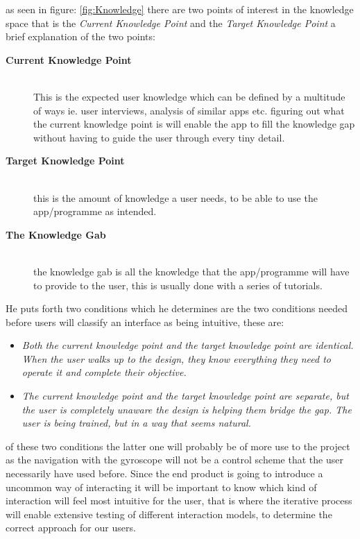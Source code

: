 as seen in figure: \ref{fig:Knowledge} there are two points of interest in the knowledge space that is the \textit{Current Knowledge Point} and the \textit{Target Knowledge Point} a brief explanation of the two points:
\begin{description}
 \item[\textbf{Current Knowledge Point}] \hfill\\
 This is the expected user knowledge which can be defined by a multitude of ways ie. user interviews, analysis of similar apps etc. figuring out what the current knowledge point is will enable the app to fill the knowledge gap without having to guide the user through every tiny detail. 
\item[\textbf{Target Knowledge Point}]\hfill\\
this is the amount of knowledge a user needs, to be able to use the app/programme as intended.
\item[\textbf{The Knowledge Gab}]\hfill\\
the knowledge gab is all the knowledge that the app/programme will have to provide to the user, this is usually done with a series of tutorials. 
\end{description}

He puts forth two conditions which he determines are the two conditions needed before users will classify an interface as being intuitive, these are:
\begin{itemize}
\item \textit{Both the current knowledge point and the target knowledge point are identical. When the user walks up to the design, they know everything they need to operate it and complete their objective.}
\item \textit{The current knowledge point and the target knowledge point are separate, but the user is completely unaware the design is helping them bridge the gap. The user is being trained, but in a way that seems natural.}
\end{itemize} 
of these two conditions the latter one will probably be of more use to the project as the navigation with the gyroscope will not be a control scheme that the user necessarily  have used before. Since the end product is going to introduce a uncommon way of interacting it will be important to know which kind of interaction will feel most intuitive for the user, that is where the iterative process will enable extensive testing of different interaction models, to determine the correct approach for our users.
